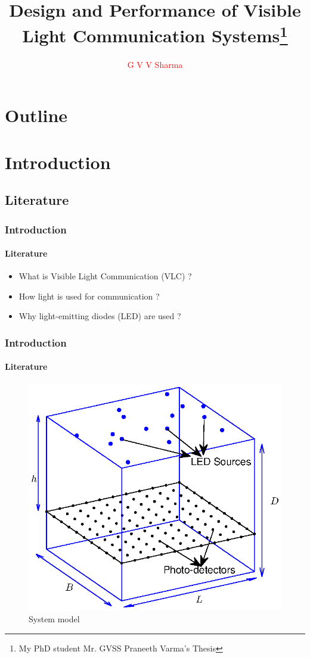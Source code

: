 \documentclass[slidestop,usepdftitle=false]{gvvslides}
\title[G V V Sharma]{Design and Performance of Visible Light Communication Systems\thanks{My PhD student Mr. GVSS Praneeth Varma's Thesis}}
\author[]{\textcolor{red}{G V V Sharma} }
\institute[{\texttt{[image: iith\_logo]}}]{
   \textcolor{brown}{Department of Electrical Engineering \\
  IIT Hyderabad} \\
  \texttt{[image: iith\_logo]}
  }
\date{
}
\begin{document}
\maketitle

\section*{Outline}
\begin{frame}
\tableofcontents
\end{frame}
\section{Introduction}
\subsection{Literature}

\begin{frame}
\frametitle{Introduction}
\framesubtitle{Literature}
\begin{itemize}
\vfill
\item What is Visible Light Communication (VLC) ?
\vfill
\item How light is used for communication ?
\vfill
\item Why light-emitting diodes (LED) are used ?
\vfill
\end{itemize}
\end{frame}

\begin{frame}
\frametitle{Introduction}
\framesubtitle{Literature}
\begin{figure}
\centering
\includegraphics[width=.75\columnwidth]{3dmodel}
\caption{System model}
\label{fig:3dmodel}
\end{figure}
\vfill
\end{frame}
\end{document}
